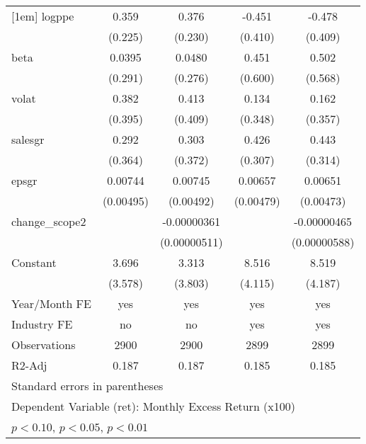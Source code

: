 \begin{table}[htbp]
\begin{tabular}{l*{4}{c}}
[1em]
logppe              &       0.359         &       0.376         &      -0.451         &      -0.478         \\
                    &     (0.225)         &     (0.230)         &     (0.410)         &     (0.409)         \\
[1em]
beta                &      0.0395         &      0.0480         &       0.451         &       0.502         \\
                    &     (0.291)         &     (0.276)         &     (0.600)         &     (0.568)         \\
[1em]
volat               &       0.382         &       0.413         &       0.134         &       0.162         \\
                    &     (0.395)         &     (0.409)         &     (0.348)         &     (0.357)         \\
[1em]
salesgr             &       0.292         &       0.303         &       0.426         &       0.443         \\
                    &     (0.364)         &     (0.372)         &     (0.307)         &     (0.314)         \\
[1em]
epsgr               &     0.00744         &     0.00745         &     0.00657         &     0.00651         \\
                    &   (0.00495)         &   (0.00492)         &   (0.00479)         &   (0.00473)         \\
[1em]
change\_scope2       &                     & -0.00000361         &                     & -0.00000465         \\
                    &                     &(0.00000511)         &                     &(0.00000588)         \\
[1em]
Constant            &       3.696         &       3.313         &       8.516\sym{**} &       8.519\sym{**} \\
                    &     (3.578)         &     (3.803)         &     (4.115)         &     (4.187)         \\
\hline
Year/Month FE       &         yes         &         yes         &         yes         &         yes         \\
Industry FE         &          no         &          no         &         yes         &         yes         \\
Observations        &        2900         &        2900         &        2899         &        2899         \\
R2-Adj              &       0.187         &       0.187         &       0.185         &       0.185         \\
\hline\hline
\multicolumn{5}{l}{\footnotesize Standard errors in parentheses}\\
\multicolumn{5}{l}{\footnotesize Dependent Variable (ret): Monthly Excess Return (x100)}\\
\multicolumn{5}{l}{\footnotesize \sym{*} \(p<0.10\), \sym{**} \(p<0.05\), \sym{***} \(p<0.01\)}\\
\end{tabular}
\end{table}
